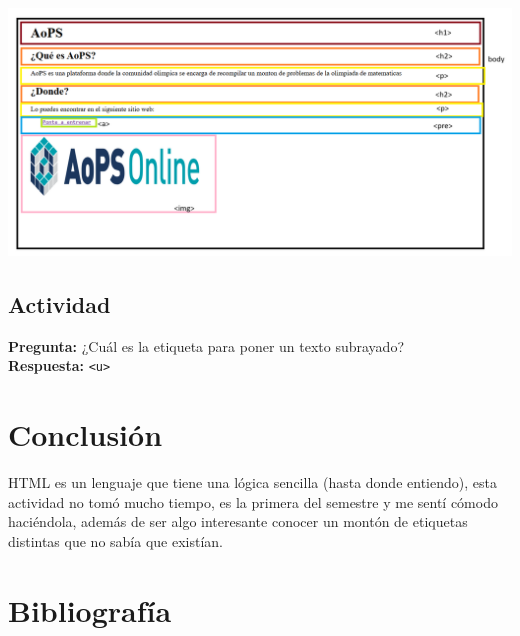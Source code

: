 \documentclass[11pt]{scrartcl}
\begin{document}
\begin{center}
    \includegraphics[scale=0.5]{CapturaHTML.png}
\end{center}


    \subsection{Actividad}

    \textbf{Pregunta: } ¿Cuál es la etiqueta para poner un texto subrayado? \\
    \textbf{Respuesta: } \texttt{<u>}
    \section{Conclusión}

    HTML es un lenguaje que tiene una lógica sencilla (hasta donde entiendo), esta actividad no tomó mucho tiempo,
    es la primera del semestre y me sentí cómodo haciéndola, además de ser algo interesante conocer un montón de etiquetas distintas que no sabía que existían.



    \section{Bibliografía}
\nocite{*}

\printbibliography[
heading=bibintoc,
title={ . }
]
    
\end{document}
